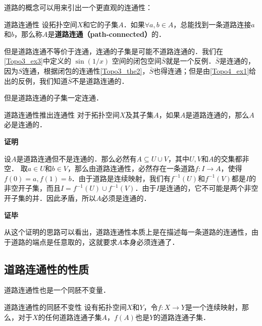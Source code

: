 道路的概念可以用来引出一个更直观的连通性：

\begin{definition}{道路连通性}\label{Topo4_def2}
设拓扑空间$X$和它的子集$A$．如果$\forall a, b\in A$，总能找到一条道路连接$a$和$b$，那么称$A$是\textbf{道路连通（path-connected）}的．
\end{definition}

但是道路连通不等价于连通，连通的子集是可能不道路连通的．我们在\autoref{Topo3_ex3}中定义的 $\sin(1/x)$ 空间的闭包空间$\bar{S}$就是一个反例．$\bar{S}$是连通的，因为$S$连通，根据闭包的连通性\autoref{Topo3_the2}，$\bar{S}$也得连通；但是由\autoref{Topo4_ex1}给出的反例，我们知道$\bar{S}$不是道路连通的．

但是道路连通的子集一定连通．

\begin{theorem}{道路连通性推出连通性}\label{Topo4_the1}
对于拓扑空间$X$及其子集$A$，如果$A$是道路连通的，那么$A$必是连通的．
\end{theorem}

\textbf{证明}

设$A$是道路连通但不是连通的．那么必然有$A\subseteq U\cup V$，其中$U, V$和$A$的交集都非空．
取$a\in U$和$b\in V$，那么由道路连通性，必然存在一条道路$f:I\rightarrow A$，使得$f(0)=a, f(1)=b$．由于道路是连续映射，我们有$f^{-1}(U)$和$f^{-1}(V)$都是$I$的非空开子集，而且$I=f^{-1}(U)\cup f^{-1}(V)$．由于$I$是连通的，它不可能是两个非空开子集的并．因此矛盾，所以$A$必须是连通的．

\textbf{证毕}

从这个证明的思路可以看出，道路连通性本质上是在描述每一条道路的连通性，由于道路的端点是任意取的，这就要求$A$本身必须连通了．

\subsection{道路连通性的性质}

道路连通性也是一个同胚不变量．

\begin{theorem}{道路连通性的同胚不变性}
设有拓扑空间$X$和$Y$，令$f:X\rightarrow Y$是一个连续映射，那么，对于$X$的任何道路连通子集$A$，$f(A)$也是$Y$的道路连通子集．
\end{theorem}